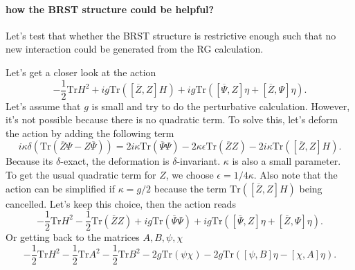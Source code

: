 
\paragraph{how the BRST structure could be helpful?}

Let's test that whether the BRST structure is restrictive enough such that no new interaction could be generated from the RG calculation.

Let's get a closer look at the action
\[
	-\frac{1}{2}\mathrm{Tr}H^2 + ig \mathrm{Tr}\left([\overline{Z},Z]H\right) + ig \mathrm{Tr}\left([\overline{\Psi},Z]\eta + [\overline{Z},\Psi]\eta\right)
.\] 
Let's assume that $g$ is small and try to do the perturbative calculation.
However, it's not possible because there is no quadratic term.
To solve this, let's deform the action by adding the following term
\[
	i \kappa \delta\left(\mathrm{Tr}(\overline{Z}\Psi - Z \overline{\Psi})\right) = 2i \kappa \mathrm{Tr}\left(\overline{\Psi}\Psi\right) - 2 \kappa \epsilon \mathrm{Tr}\left(\overline{Z}Z\right) - 2i\kappa \mathrm{Tr}\left([\overline{Z},Z]H\right)
.\] 
Because its $\delta$-exact, the deformation is $\delta$-invariant.
$\kappa$ is also a small parameter.
To get the usual quadratic term for $Z$, we choose $\epsilon = 1 / 4\kappa$.
Also note that the action can be simplified if $\kappa = g / 2$ because the term $\mathrm{Tr}\left([\overline{Z},Z]H\right)$ being cancelled.
Let's keep this choice, then the action reads
\[
	- \frac{1}{2} \mathrm{Tr} H^2 - \frac{1}{2} \mathrm{Tr}(\overline{Z}Z) + ig \mathrm{Tr}(\overline{\Psi}\Psi) + ig \mathrm{Tr}\left([\overline{\Psi},Z]\eta + [\overline{Z},\Psi]\eta\right)
.\] 
Or getting back to the matrices $A,B,\psi,\chi$
\[
	- \frac{1}{2}\mathrm{Tr}H^2 - \frac{1}{2}\mathrm{Tr}A^2 - \frac{1}{2}\mathrm{Tr}B^2 - 2 g \mathrm{Tr}(\psi \chi) - 2 g \mathrm{Tr} \left([\psi,B]\eta - [\chi,A]\eta\right)
.\] 

